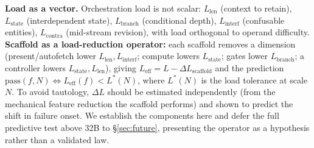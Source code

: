\textbf{Load as a vector.} Orchestration load is not scalar: $L_{\mathrm{len}}$ (context to retain), $L_{\mathrm{state}}$ (interdependent state), $L_{\mathrm{branch}}$ (conditional depth), $L_{\mathrm{interf}}$ (confusable entities), $L_{\mathrm{contra}}$ (mid-stream revision), with load orthogonal to operand difficulty. \textbf{Scaffold as a load-reduction operator:} each scaffold removes a dimension (present/autofetch lower $L_{\mathrm{len}},L_{\mathrm{interf}}$; compute lowers $L_{\mathrm{state}}$; gates lower $L_{\mathrm{branch}}$; a controller lowers $L_{\mathrm{state}},L_{\mathrm{len}}$), giving $L_{\mathrm{eff}} = L - \Delta L_{\mathrm{scaffold}}$ and the prediction $\mathrm{pass}(f,N) \Leftrightarrow L_{\mathrm{eff}}(f) < L^*(N)$, where $L^*(N)$ is the load tolerance at scale $N$. To avoid tautology, $\Delta L$ should be estimated independently (from the mechanical feature reduction the scaffold performs) and shown to predict the shift in failure onset. We establish the components here and defer the full predictive test above 32B to \S\ref{sec:future}, presenting the operator as a hypothesis rather than a validated law.
